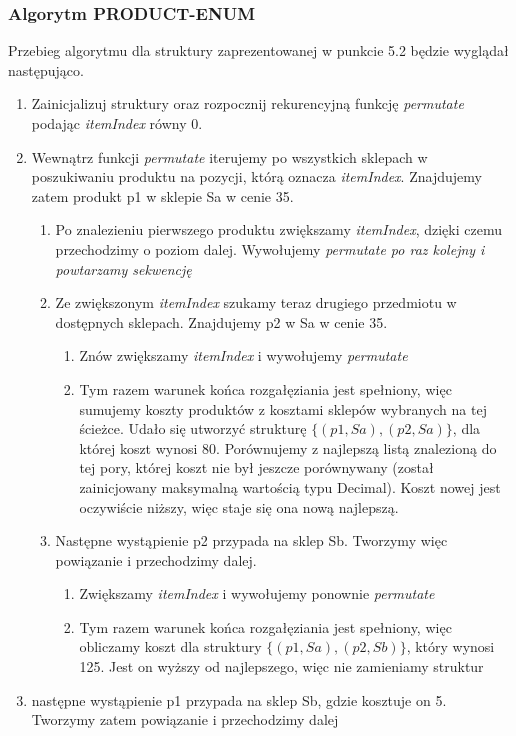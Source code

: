 \documentclass[a4paper]{article}
\begin{document}
\subsubsection{Algorytm PRODUCT-ENUM}
Przebieg algorytmu dla struktury zaprezentowanej w punkcie 5.2 będzie wyglądał następująco.
\begin{enumerate}
\item{ Zainicjalizuj struktury oraz rozpocznij rekurencyjną funkcję \textit{permutate} podając \textit{itemIndex} równy 0.}
\item { Wewnątrz funkcji \textit{permutate} iterujemy po wszystkich sklepach w poszukiwaniu produktu na pozycji, którą oznacza \textit{itemIndex}. Znajdujemy zatem produkt p1 w sklepie Sa w cenie 35.
\begin{enumerate}
\item{Po znalezieniu pierwszego produktu zwiększamy \textit{itemIndex}, dzięki czemu przechodzimy o poziom dalej. Wywołujemy \textit{permutate po raz kolejny i powtarzamy sekwencję}}
\item{Ze zwiększonym \textit{itemIndex} szukamy teraz drugiego przedmiotu w dostępnych sklepach. Znajdujemy p2 w Sa w cenie 35.
\begin{enumerate}
\item{Znów zwiększamy \textit{itemIndex} i wywołujemy \textit{permutate}}
\item{Tym razem warunek końca rozgałęziania jest spełniony, więc sumujemy koszty produktów z kosztami sklepów wybranych na tej ścieżce. Udało się utworzyć strukturę $\{(p1, Sa), (p2, Sa)\}$, dla której koszt wynosi 80. Porównujemy z najlepszą listą znalezioną do tej pory, której koszt nie był jeszcze porównywany (został zainicjowany maksymalną wartością typu Decimal). Koszt nowej jest oczywiście niższy, więc staje się ona nową najlepszą.}
\end{enumerate}}
\item {Następne wystąpienie p2 przypada na sklep Sb. Tworzymy więc powiązanie i przechodzimy dalej.
\begin{enumerate}
\item{Zwiększamy \textit{itemIndex} i wywołujemy ponownie \textit{permutate}}
\item{Tym razem warunek końca rozgałęziania jest spełniony, więc obliczamy koszt dla struktury $\{(p1, Sa), (p2, Sb)\}$, który wynosi 125. Jest on wyższy od najlepszego, więc nie zamieniamy struktur}
\end{enumerate}
}
\end{enumerate}
}
\item{następne wystąpienie p1 przypada na sklep Sb, gdzie kosztuje on 5. Tworzymy zatem powiązanie i przechodzimy dalej
}
\end{enumerate}
\end{document}

